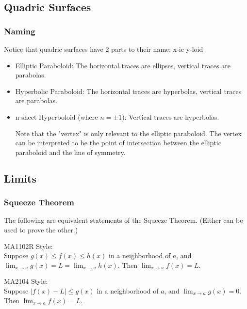 \documentclass{article}
\begin{document}
\subsection{Quadric Surfaces}
\subsubsection{Naming}
Notice that quadric surfaces have 2 parts to their name: x-ic y-loid\\
\begin{itemize}
	\item Elliptic Paraboloid: The horizontal traces are ellipses, vertical traces are parabolas.
	\item Hyperbolic Paraboloid: The horizontal traces are hyperbolas, vertical traces are parabolas. 
	\item n-sheet Hyperboloid (where $n=\pm 1$): Vertical traces are hyperbolas.
	
Note that the "vertex" is only relevant to the elliptic paraboloid. The vertex can be interpreted to be the point of intersection between the elliptic paraboloid and the line of symmetry.
\end{itemize}

\subsection{Limits}
\subsubsection{Squeeze Theorem}
The following are equivalent statements of the Squeeze Theorem. (Either can be used to prove the other.)

MA1102R Style:\\
Suppose $g(x)\leq f(x)\leq h(x)$ in a neighborhood of $a$, and $\lim_{x\rightarrow a}g(x)=L=\lim_{x\rightarrow a}h(x)$. Then $\lim_{x\rightarrow a}f(x)=L$.

MA2104 Style:\\
Suppose $|f(x)-L|\leq g(x)$ in a neighborhood of $a$, and $\lim_{x\rightarrow a}g(x)=0$. Then $\lim_{x\rightarrow a}f(x)=L$.
\end{document}
